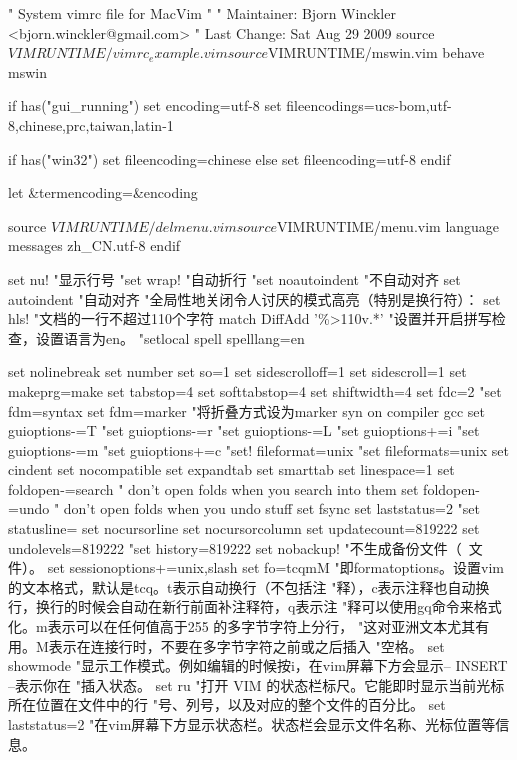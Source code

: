 " System vimrc file for MacVim
"
" Maintainer:	Bjorn Winckler <bjorn.winckler@gmail.com>
" Last Change:	Sat Aug 29 2009
source $VIMRUNTIME/vimrc_example.vim
source $VIMRUNTIME/mswin.vim
behave mswin

if has("gui_running")
    set encoding=utf-8
    set fileencodings=ucs-bom,utf-8,chinese,prc,taiwan,latin-1

    if has("win32")
        set fileencoding=chinese
    else
        set fileencoding=utf-8
    endif

    let &termencoding=&encoding

source $VIMRUNTIME/delmenu.vim
source $VIMRUNTIME/menu.vim
language messages zh_CN.utf-8
endif

set nu!                    "显示行号
"set wrap!                 "自动折行
"set noautoindent          "不自动对齐
set autoindent             "自动对齐
"全局性地关闭令人讨厌的模式高亮（特别是换行符）：
set hls!
"文档的一行不超过110个字符
match DiffAdd '\%>110v.*'
"设置并开启拼写检查，设置语言为en。
"setlocal spell spelllang=en


set nolinebreak
set number
set so=1
set sidescrolloff=1
set sidescroll=1
set makeprg=make
set tabstop=4
set softtabstop=4
set shiftwidth=4
set fdc=2 
"set fdm=syntax
set fdm=marker "将折叠方式设为marker
syn on
compiler gcc
set guioptions-=T
"set guioptions-=r
"set guioptions-=L
"set guioptions+=i
"set guioptions-=m
"set guioptions+=c
"set! fileformat=unix
"set fileformats=unix
set cindent
set nocompatible
set expandtab
set smarttab
set linespace=1
set foldopen-=search " don't open folds when you search into them
set foldopen-=undo " don't open folds when you undo stuff
set fsync
set laststatus=2
"set statusline=%
set nocursorline
set nocursorcolumn
set updatecount=819222
set undolevels=819222
"set history=819222
set nobackup! "不生成备份文件（~文件）。
set sessionoptions+=unix,slash
set fo=tcqmM
"即formatoptions。设置vim的文本格式，默认是tcq。t表示自动换行（不包括注
"释），c表示注释也自动换行，换行的时候会自动在新行前面补注释符，q表示注
"释可以使用gq命令来格式化。m表示可以在任何值高于255 的多字节字符上分行，
"这对亚洲文本尤其有用。M表示在连接行时，不要在多字节字符之前或之后插入
"空格。
set showmode
"显示工作模式。例如编辑的时候按i，在vim屏幕下方会显示– INSERT –表示你在
"插入状态。 
set ru 
"打开 VIM 的状态栏标尺。它能即时显示当前光标所在位置在文件中的行
"号、列号，以及对应的整个文件的百分比。
set laststatus=2 
"在vim屏幕下方显示状态栏。状态栏会显示文件名称、光标位置等信息。


